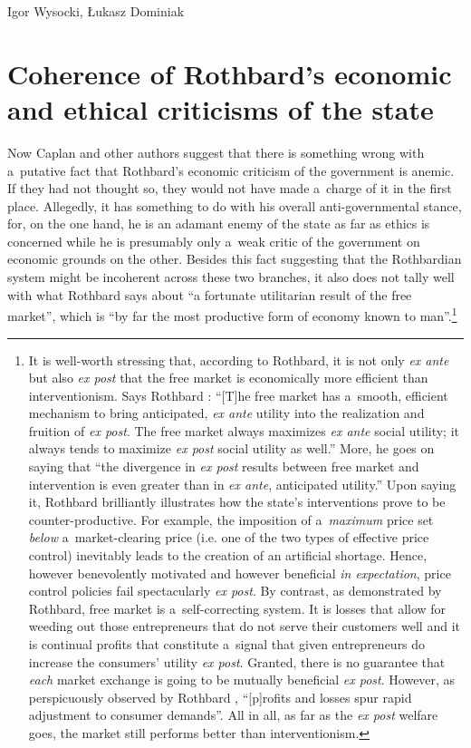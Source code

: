 \begin{artengenv}{Igor Wysocki, Łukasz Dominiak}
\section{Coherence of Rothbard's economic and ethical criticisms of the state}

Now Caplan and other authors suggest that there is something wrong with a~putative fact that Rothbard's economic criticism of the government is anemic. If they had not thought so, they would not have made a~charge of it in the first place. Allegedly, it has something to do with his overall anti-governmental stance, for, on the one hand, he is an adamant enemy of the state as far as ethics is concerned while he is presumably only a~weak critic of the government on economic grounds on the other. Besides this fact suggesting that the Rothbardian system might be incoherent across these two branches, it also does not tally well with what Rothbard says about ``a fortunate utilitarian result of the free market'', which is ``by far the most productive form of economy known to man''.\footnote{It is well-worth stressing that, according to Rothbard, it is not only \textit{ex ante} but also \textit{ex post} that the free market is economically more efficient than interventionism. Says Rothbard 
\parencite*[][p.891]{rothbard_man_2009}: %
 ``[T]he free market has a~smooth, efficient mechanism to bring anticipated, \textit{ex ante} utility into the realization and fruition of \textit{ex post}. The free market always maximizes \textit{ex ante} social utility; it always tends to maximize \textit{ex post} social utility as well.'' More, he goes on saying that ``the divergence in \textit{ex post} results between free market and intervention is even greater than in \textit{ex ante}, anticipated utility.'' Upon saying it, Rothbard brilliantly illustrates how the state's interventions prove to be counter-productive. For example, the imposition of a~\textit{maximum} price set \textit{below} a~market-clearing price (i.e. one of the two types of effective price control) inevitably leads to the creation of an artificial shortage. Hence, however benevolently motivated and however beneficial \textit{in expectation}, price control policies fail spectacularly \textit{ex post}. By contrast, as demonstrated by Rothbard, free market is a~self-correcting system. It is losses that allow for weeding out those entrepreneurs that do not serve their customers well and it is continual profits that constitute a~signal that given entrepreneurs do increase the consumers' utility \textit{ex post}. Granted, there is no guarantee that \textit{each} market exchange is going to be mutually beneficial \textit{ex post}. However, as perspicuously observed by Rothbard 
\parencite*[][p.885]{rothbard_man_2009}, %
 ``[p]rofits and losses spur rapid adjustment to consumer demands''. All in all, as far as the \textit{ex post} welfare goes, the market still performs better than interventionism. } 
\parencite[][p.48]{rothbard_for_2006}%





\end{artengenv}
